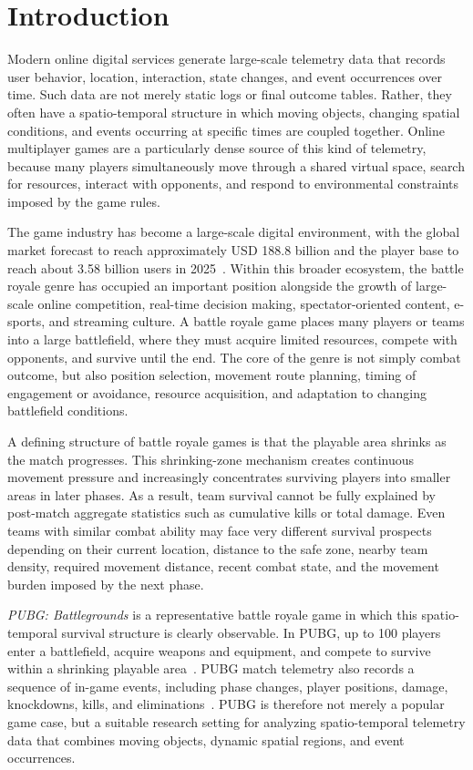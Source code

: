 \section{Introduction}

Modern online digital services generate large-scale telemetry data that records user behavior, location, interaction, state changes, and event occurrences over time. Such data are not merely static logs or final outcome tables. Rather, they often have a spatio-temporal structure in which moving objects, changing spatial conditions, and events occurring at specific times are coupled together. Online multiplayer games are a particularly dense source of this kind of telemetry, because many players simultaneously move through a shared virtual space, search for resources, interact with opponents, and respond to environmental constraints imposed by the game rules.

The game industry has become a large-scale digital environment, with the global market forecast to reach approximately USD 188.8 billion and the player base to reach about 3.58 billion users in 2025~\cite{newzoo2025globalgames}. Within this broader ecosystem, the battle royale genre has occupied an important position alongside the growth of large-scale online competition, real-time decision making, spectator-oriented content, e-sports, and streaming culture. A battle royale game places many players or teams into a large battlefield, where they must acquire limited resources, compete with opponents, and survive until the end. The core of the genre is not simply combat outcome, but also position selection, movement route planning, timing of engagement or avoidance, resource acquisition, and adaptation to changing battlefield conditions.

A defining structure of battle royale games is that the playable area shrinks as the match progresses. This shrinking-zone mechanism creates continuous movement pressure and increasingly concentrates surviving players into smaller areas in later phases. As a result, team survival cannot be fully explained by post-match aggregate statistics such as cumulative kills or total damage. Even teams with similar combat ability may face very different survival prospects depending on their current location, distance to the safe zone, nearby team density, required movement distance, recent combat state, and the movement burden imposed by the next phase.

\textit{PUBG: Battlegrounds} is a representative battle royale game in which this spatio-temporal survival structure is clearly observable. In PUBG, up to 100 players enter a battlefield, acquire weapons and equipment, and compete to survive within a shrinking playable area~\cite{pubgGameInfo}. PUBG match telemetry also records a sequence of in-game events, including phase changes, player positions, damage, knockdowns, kills, and eliminations~\cite{pubgTelemetryEvents}. PUBG is therefore not merely a popular game case, but a suitable research setting for analyzing spatio-temporal telemetry data that combines moving objects, dynamic spatial regions, and event occurrences.

